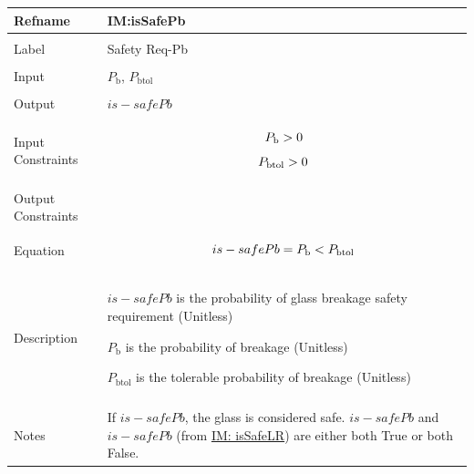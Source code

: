 \documentclass[12pt]{article}
\newcommand{\gt}{\ensuremath >}
\newcommand{\lt}{\ensuremath <}
\begin{document}
\begin{minipage}{\textwidth}
\begin{tabular}{>{\raggedright}p{}>{\raggedright\arraybackslash}p{}}
\toprule \textbf{Refname} & \textbf{IM:isSafePb}
\label{IM:isSafePb}
\\ \midrule \\
Label & Safety Req-Pb
        
\\ \midrule \\
Input & ${P_{\text{b}}}$, ${P_{\text{b}\text{tol}}}$
        
\\ \midrule \\
Output & $is-safePb$
         
\\ \midrule \\
Input Constraints & \begin{displaymath}
                    {P_{\text{b}}}\gt{}0
                    \end{displaymath}
                    \begin{displaymath}
                    {P_{\text{b}\text{tol}}}\gt{}0
                    \end{displaymath}
\\ \midrule \\
Output Constraints & 
\\ \midrule \\
Equation & \begin{displaymath}
           is-safePb={P_{\text{b}}}\lt{}{P_{\text{b}\text{tol}}}
           \end{displaymath}
\\ \midrule \\
Description & \begin{symbDescription}
              \item{$is-safePb$ is the probability of glass breakage safety requirement (Unitless)}
              \item{${P_{\text{b}}}$ is the probability of breakage (Unitless)}
              \item{${P_{\text{b}\text{tol}}}$ is the tolerable probability of breakage (Unitless)}
              \end{symbDescription}
\\ \midrule \\
Notes & If $is-safePb$, the glass is considered safe. $is-safePb$ and $is-safePb$ (from \hyperref[IM:isSafeLR]{IM: isSafeLR}) are either both True or both False.
        

\end{tabular}
\end{minipage}
\end{document}
